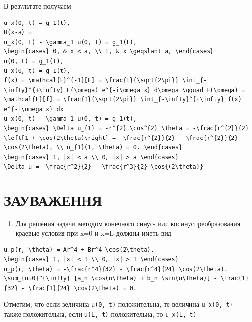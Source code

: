 \documentclass[
  ukrainian,
]{article}
\providecommand{\tightlist}{%
  \setlength{\itemsep}{0pt}\setlength{\parskip}{0pt}}
\begin{document}
В результате получаем

\begin{verbatim}
u_x(0, t) = g_1(t),
H(x-a) =
u_x(0, t) - \gamma_1 u(0, t) = g_1(t),
\begin{cases} 0, & x < a, \\ 1, & x \geqslant a, \end{cases}
u(0, t) = g_1(t),
u_x(0, t) = g_1(t),
f(x) = \mathcal{F}^{-1}[F] = \frac{1}{\sqrt{2\pi}} \int_{-\infty}^{+\infty} F(\omega) e^{-i\omega x} d\omega \qquad F(\omega) = \mathcal{F}[f] = \frac{1}{\sqrt{2\pi}} \int_{-\infty}^{+\infty} f(x) e^{-i\omega x} dx
u_x(0, t) - \gamma_1 u(0, t) = g_1(t),
\begin{cases} \Delta u_{1} = -r^{2} \cos^{2} \theta = -\frac{r^{2}}{2} \left[1 + \cos(2\theta)\right] = -\frac{r^{2}}{2} - \frac{r^{2}}{2} \cos(2\theta), \\ u_{1}(1, \theta) = 0. \end{cases}
\begin{cases} 1, |x| < a \\ 0, |x| > a \end{cases}
\Delta u = -\frac{r^2}{2} - \frac{r^3}{2} \cos{(2\theta)}
\end{verbatim}

\section{ЗАУВАЖЕННЯ}\label{ux437ux430ux443ux432ux430ux436ux435ux43dux43dux44f-5}

\begin{enumerate}
\def\labelenumi{\arabic{enumi}.}
\tightlist
\item
  Для решения задачи методом конечного синус- или косинуспреобразования
  краевые условия при x=0 и x=L должны иметь вид
\end{enumerate}

\begin{verbatim}
u_p(r, \theta) = Ar^4 + Br^4 \cos(2\theta).
\begin{cases} 1, |x| < 1 \\ 0, |x| > 1 \end{cases}
u_p(r, \theta) = -\frac{r^4}{32} - \frac{r^4}{24} \cos(2\theta).
\sum_{n=0}^{\infty} [a_n \cos(n\theta) + b_n \sin(n\theta)] - \frac{1}{32} - \frac{1}{24} \cos(2\theta) = 0.
\end{verbatim}

Отметим, что если величина \texttt{u(0,\ t)} положительна, то величина
\texttt{u\_x(0,\ t)} также положительна, если \texttt{u(L,\ t)}
положительна, то \texttt{u\_x(L,\ t)}
\end{document}
